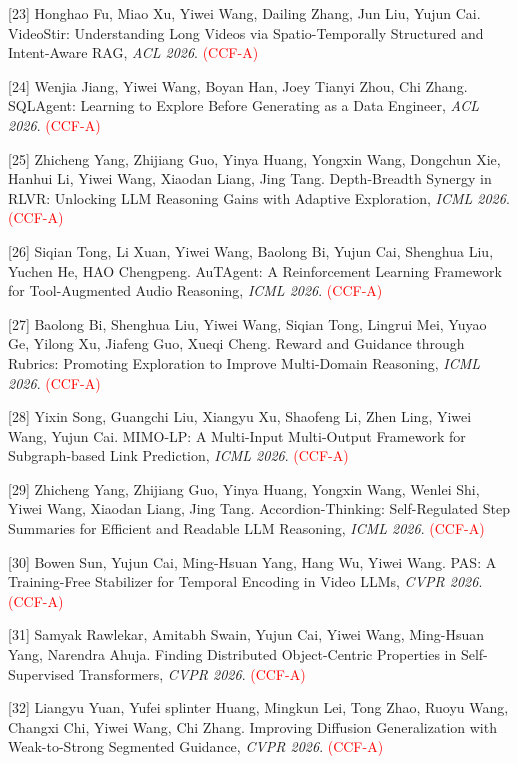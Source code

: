 [23] Honghao Fu, Miao Xu, Yiwei Wang, Dailing Zhang, Jun Liu, Yujun Cai. VideoStir: Understanding Long Videos via Spatio-Temporally Structured and Intent-Aware RAG, \textit{ACL 2026}. \textcolor{red}{(CCF-A)}

[24] Wenjia Jiang, Yiwei Wang, Boyan Han, Joey Tianyi Zhou, Chi Zhang. SQLAgent: Learning to Explore Before Generating as a Data Engineer, \textit{ACL 2026}. \textcolor{red}{(CCF-A)}

[25] Zhicheng Yang, Zhijiang Guo, Yinya Huang, Yongxin Wang, Dongchun Xie, Hanhui Li, Yiwei Wang, Xiaodan Liang, Jing Tang. Depth-Breadth Synergy in RLVR: Unlocking LLM Reasoning Gains with Adaptive Exploration, \textit{ICML 2026}. \textcolor{red}{(CCF-A)}

[26] Siqian Tong, Li Xuan, Yiwei Wang, Baolong Bi, Yujun Cai, Shenghua Liu, Yuchen He, HAO Chengpeng. AuTAgent: A Reinforcement Learning Framework for Tool-Augmented Audio Reasoning, \textit{ICML 2026}. \textcolor{red}{(CCF-A)}

[27] Baolong Bi, Shenghua Liu, Yiwei Wang, Siqian Tong, Lingrui Mei, Yuyao Ge, Yilong Xu, Jiafeng Guo, Xueqi Cheng. Reward and Guidance through Rubrics: Promoting Exploration to Improve Multi-Domain Reasoning, \textit{ICML 2026}. \textcolor{red}{(CCF-A)}

[28] Yixin Song, Guangchi Liu, Xiangyu Xu, Shaofeng Li, Zhen Ling, Yiwei Wang, Yujun Cai. MIMO-LP: A Multi-Input Multi-Output Framework for Subgraph-based Link Prediction, \textit{ICML 2026}. \textcolor{red}{(CCF-A)}

[29] Zhicheng Yang, Zhijiang Guo, Yinya Huang, Yongxin Wang, Wenlei Shi, Yiwei Wang, Xiaodan Liang, Jing Tang. Accordion-Thinking: Self-Regulated Step Summaries for Efficient and Readable LLM Reasoning, \textit{ICML 2026}. \textcolor{red}{(CCF-A)}

[30] Bowen Sun, Yujun Cai, Ming-Hsuan Yang, Hang Wu, Yiwei Wang. PAS: A Training-Free Stabilizer for Temporal Encoding in Video LLMs, \textit{CVPR 2026}. \textcolor{red}{(CCF-A)}

[31] Samyak Rawlekar, Amitabh Swain, Yujun Cai, Yiwei Wang, Ming-Hsuan Yang, Narendra Ahuja. Finding Distributed Object-Centric Properties in Self-Supervised Transformers, \textit{CVPR 2026}. \textcolor{red}{(CCF-A)}

[32] Liangyu Yuan, Yufei splinter Huang, Mingkun Lei, Tong Zhao, Ruoyu Wang, Changxi Chi, Yiwei Wang, Chi Zhang. Improving Diffusion Generalization with Weak-to-Strong Segmented Guidance, \textit{CVPR 2026}. \textcolor{red}{(CCF-A)}

